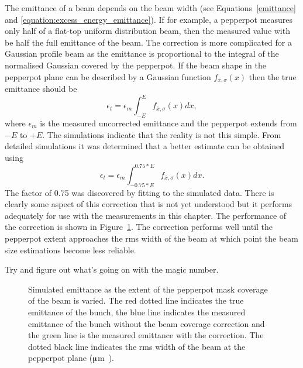 The emittance of a beam depends on the beam width (see Equations~\ref{emittance} and \ref{equation:excess_energy_emittance}).
If for example, a pepperpot measures only half of a flat-top uniform distribution beam, then the measured value with be half the full emittance of the beam.
The correction is more complicated for a Gaussian profile beam as the emittance is proportional to the integral of the normalised Gaussian covered by the pepperpot.
If the beam shape in the pepperpot plane can be described by a Gaussian function $f_{\bar{x},\sigma}(x)$ then the true emittance should be
\begin{equation}
\epsilon_t = \epsilon_m \int_{-E}^{E} f_{\bar{x}, \sigma}(x) dx,
\end{equation}
where $\epsilon_m$ is the measured uncorrected emittance and the pepperpot extends from $-E$ to $+E$.
The simulations indicate that the reality is not this simple.
From detailed simulations it was determined that a better estimate can be obtained using
\begin{equation}
\epsilon_t = \epsilon_m \int_{-0.75*E}^{0.75*E} f_{\bar{x}, \sigma}(x) dx.
\end{equation}
The factor of 0.75 was discovered by fitting to the simulated data.
There is clearly some aspect of this correction that is not yet understood but it performs adequately for use with the measurements in this chapter.
The performance of the correction is shown in Figure~\ref{figure:pepperpot_extent}.
The correction performs well until the pepperpot extent approaches the \gls{rms} width of the beam at which point the beam size estimations become less reliable.

{\color{red}
Try and figure out what's going on with the magic number.
}

\begin{figure}
    \center
    
    \caption[Results of a simulation investigating the efficacy of the beam coverage correction for various beam sizes.]{Simulated emittance as the extent of the pepperpot mask coverage of the beam is varied.
    The red dotted line indicates the true emittance of the bunch, the blue line indicates the measured emittance of the bunch without the beam coverage correction and the green line is the measured emittance with the correction.
    The dotted black line indicates the \gls{rms} width of the beam at the pepperpot plane (\unit[873]{$\muup$m}).}
    \label{figure:pepperpot_extent}
\end{figure}

